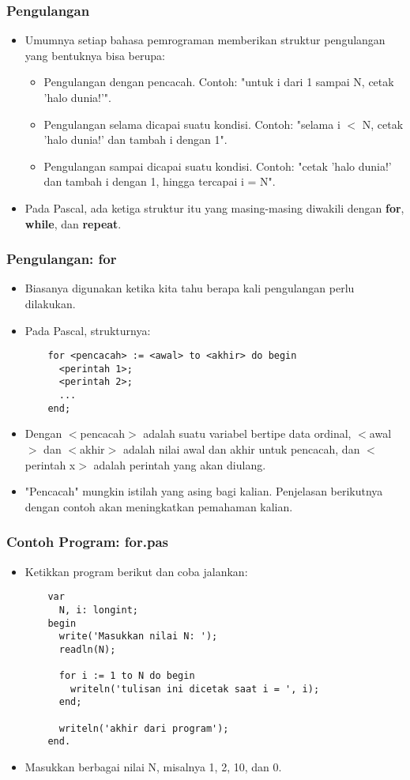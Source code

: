 \begin{frame}
\frametitle{Pengulangan}
\begin{itemize}
  \item Umumnya setiap bahasa pemrograman memberikan struktur pengulangan yang bentuknya bisa berupa:
  \begin{itemize}
    \item Pengulangan dengan pencacah. Contoh: "untuk i dari 1 sampai N, cetak 'halo dunia!'".
    \item Pengulangan selama dicapai suatu kondisi. Contoh: "selama i $<$ N, cetak 'halo dunia!' dan tambah i dengan 1".
    \item Pengulangan sampai dicapai suatu kondisi. Contoh: "cetak 'halo dunia!' dan tambah i dengan 1, hingga tercapai i = N".
  \end{itemize}
  \item Pada Pascal, ada ketiga struktur itu yang masing-masing diwakili dengan \alert{\textbf{for}}, \alert{\textbf{while}}, dan \alert{\textbf{repeat}}.
\end{itemize}
\end{frame}

\begin{frame}[fragile]
\frametitle{Pengulangan: for}
\begin{itemize}
  \item Biasanya digunakan ketika kita tahu berapa kali pengulangan perlu dilakukan.
  \item Pada Pascal, strukturnya:
  \begin{lstlisting}
    for <pencacah> := <awal> to <akhir> do begin
      <perintah 1>;
      <perintah 2>;
      ...
    end;
  \end{lstlisting}
  \item Dengan $<$pencacah$>$ adalah suatu variabel bertipe data \alert{ordinal}, $<$awal$>$ dan $<$akhir$>$ adalah nilai awal dan akhir untuk pencacah, dan $<$perintah x$>$ adalah perintah yang akan diulang.
  \item "Pencacah" mungkin istilah yang asing bagi kalian. Penjelasan berikutnya dengan contoh akan meningkatkan pemahaman kalian.
\end{itemize}
\end{frame}

\begin{frame}[fragile]
\frametitle{Contoh Program: for.pas}
\begin{itemize}
  \item Ketikkan program berikut dan coba jalankan:
  \begin{lstlisting}
    var
      N, i: longint;
    begin
      write('Masukkan nilai N: ');
      readln(N);

      for i := 1 to N do begin
        writeln('tulisan ini dicetak saat i = ', i);
      end;

      writeln('akhir dari program');
    end.
  \end{lstlisting}
  \item Masukkan berbagai nilai N, misalnya 1, 2, 10, dan 0.
\end{itemize}
\end{frame}

